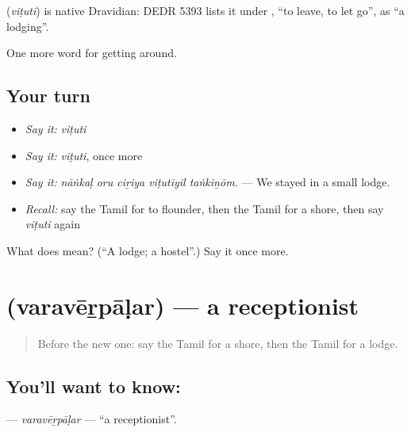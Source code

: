\begin{cousinweb}
\textbf{} (\emph{viṭuti}) is native Dravidian: DEDR 5393 lists it under , \textquotedblleft{}to leave, to let go\textquotedblright{}, as \textquotedblleft{}a lodging\textquotedblright{}.
\end{cousinweb}

\begin{grammarlens}[title={What you've built}]
One more word for getting around.
\end{grammarlens}

\subsection*{Your turn}
\begin{itemize}
\raggedright
  \item \emph{Say it:} \emph{viṭuti}
  \item \emph{Say it:} \emph{viṭuti}, once more
  \item \emph{Say it:} \emph{nāṅkaḷ oru ciṟiya viṭutiyil taṅkiṉōm.} — We stayed in a small lodge.
  \item \emph{Recall:} say the Tamil for to flounder, then the Tamil for a shore, then say \emph{viṭuti} again
\end{itemize}

\begin{tcolorbox}[breakable,colback=teal!4,colframe=teal!35!black,title={Before you move on}]
What does  mean? (\textquotedblleft{}A lodge; a hostel\textquotedblright{}.) Say it once more.
\end{tcolorbox}
\section[\texorpdfstring{\ta{வரவேற்பாளர்} (varavēṟpāḷar)}{வரவேற்பாளர் (varavēṟpāḷar)}]{ (varavēṟpāḷar) — a receptionist}

\label{lesson:TA-C418-varaverpalar}



\begin{quote}
Before the new one: say the Tamil for a shore, then the Tamil for a lodge.
\end{quote}

\subsection*{You'll want to know: }
\textbf{} — \emph{varavēṟpāḷar} — \textquotedblleft{}a receptionist\textquotedblright{}.

